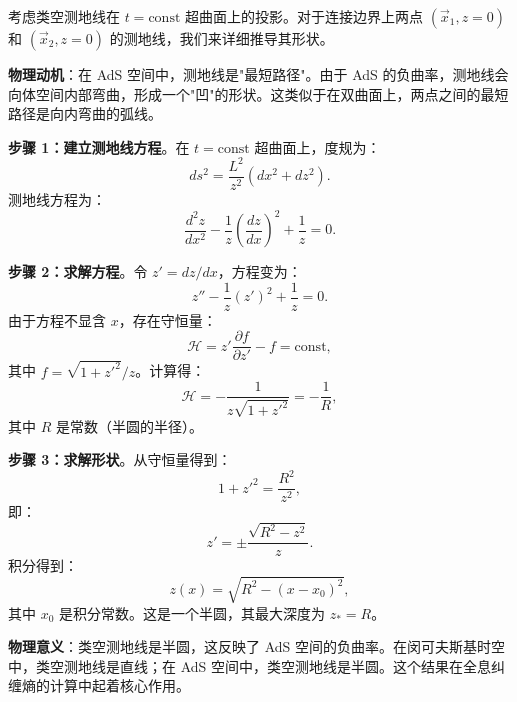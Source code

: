 \begin{example}[类空测地线的推导]
考虑类空测地线在 $t = \text{const}$ 超曲面上的投影。对于连接边界上两点 $(\vec{x}_1, z=0)$ 和 $(\vec{x}_2, z=0)$ 的测地线，我们来详细推导其形状。

\textbf{物理动机}：在 AdS 空间中，测地线是"最短路径"。由于 AdS 的负曲率，测地线会向体空间内部弯曲，形成一个"凹"的形状。这类似于在双曲面上，两点之间的最短路径是向内弯曲的弧线。

\textbf{步骤 1：建立测地线方程}。在 $t = \text{const}$ 超曲面上，度规为：
\begin{equation}
    ds^2 = \frac{L^2}{z^2} (dx^2 + dz^2).
\end{equation}
测地线方程为：
\begin{equation}
    \frac{d^2 z}{dx^2} - \frac{1}{z} \left(\frac{dz}{dx}\right)^2 + \frac{1}{z} = 0.
\end{equation}

\textbf{步骤 2：求解方程}。令 $z' = dz/dx$，方程变为：
\begin{equation}
    z'' - \frac{1}{z} (z')^2 + \frac{1}{z} = 0.
\end{equation}
由于方程不显含 $x$，存在守恒量：
\begin{equation}
    \mathcal{H} = z' \frac{\partial f}{\partial z'} - f = \text{const},
\end{equation}
其中 $f = \sqrt{1 + z'^2}/z$。计算得：
\begin{equation}
    \mathcal{H} = -\frac{1}{z\sqrt{1 + z'^2}} = -\frac{1}{R},
\end{equation}
其中 $R$ 是常数（半圆的半径）。

\textbf{步骤 3：求解形状}。从守恒量得到：
\begin{equation}
    1 + z'^2 = \frac{R^2}{z^2},
\end{equation}
即：
\begin{equation}
    z' = \pm \frac{\sqrt{R^2 - z^2}}{z}.
\end{equation}
积分得到：
\begin{equation}
    z(x) = \sqrt{R^2 - (x - x_0)^2},
\end{equation}
其中 $x_0$ 是积分常数。这是一个半圆，其最大深度为 $z_* = R$。

\textbf{物理意义}：类空测地线是半圆，这反映了 AdS 空间的负曲率。在闵可夫斯基时空中，类空测地线是直线；在 AdS 空间中，类空测地线是半圆。这个结果在全息纠缠熵的计算中起着核心作用。
\end{example}

